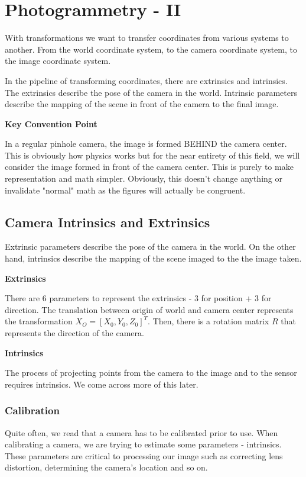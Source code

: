 \chapter{Photogrammetry - II}

With transformations we want to transfer coordinates from various systems to another. From the world coordinate system, to the camera coordinate system, to the image coordinate system.

In the pipeline of transforming coordinates, there are extrinsics and intrinsics. The extrinsics describe the pose of the camera in the world. Intrinsic parameters describe the mapping of the scene in front of the camera to the final image. 

\textbf{Key Convention Point}

In a regular pinhole camera, the image is formed BEHIND the camera center. This is obviously how physics works but for the near entirety of this field, we will consider the image formed in front of the camera center. This is purely to make representation and math simpler. Obviously, this doesn't change anything or invalidate "normal" math as the figures will actually be congruent.

\section{Camera Intrinsics and Extrinsics}

Extrinsic parameters describe the pose of the camera in the world. On the other hand, intrinsics describe the mapping of the scene imaged to the the image taken.

\textbf{Extrinsics}

There are 6 parameters to represent the extrinsics - 3 for position + 3 for direction. The translation between origin of world and camera center represents the transformation $X_O = [X_0, Y_0, Z_0]^T$. Then, there is a rotation matrix $R$ that represents the direction of the camera. 

\textbf{Intrinsics}

The process of projecting points from the camera to the image and to the sensor requires intrinsics. We come across more of this later.

\subsection{Calibration}

Quite often, we read that a camera has to be calibrated prior to use. When calibrating a camera, we are trying to estimate some parameters - intrinsics. These parameters are critical to processing our image such as correcting lens distortion, determining the camera's location and so on.


